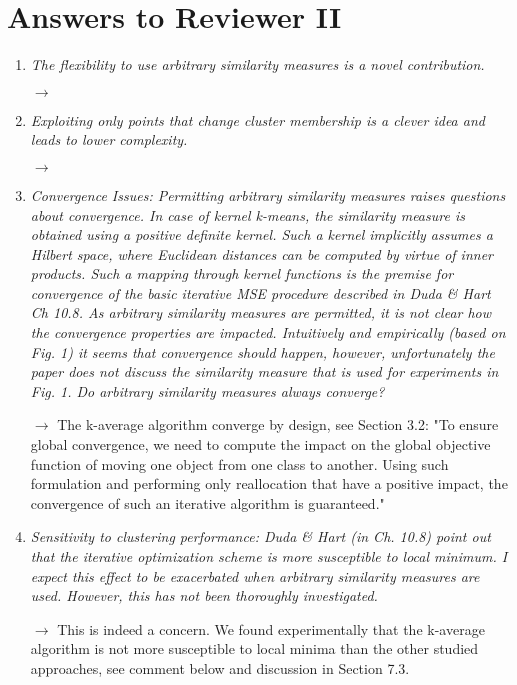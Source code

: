 \documentclass[10pt]{article}
\begin{document}
\section{Answers to Reviewer II}


\begin{enumerate}

\item \emph{The flexibility to use arbitrary similarity measures is a novel contribution.}

$\rightarrow$

\item \emph{Exploiting only points that change cluster membership is a clever idea and leads to lower complexity.}

$\rightarrow$


\item \emph{Convergence Issues: Permitting arbitrary similarity measures raises questions about convergence. In case of kernel k-means, the similarity measure is obtained using a positive definite kernel. Such a kernel implicitly assumes a Hilbert space, where Euclidean distances can be computed by virtue of inner products. Such a mapping through kernel functions is the premise for convergence of the basic iterative MSE procedure described in Duda \& Hart Ch 10.8. As arbitrary similarity measures are permitted, it is not clear how the convergence properties are impacted. Intuitively and empirically (based on Fig. 1) it seems that convergence should happen, however, unfortunately the paper does not discuss the similarity measure that is used for experiments in Fig. 1. Do arbitrary similarity measures always converge?}

$\rightarrow$ The k-average algorithm converge by design, see Section 3.2: "To ensure global convergence, we need to compute the impact on the global objective function of moving one object from one class to another. Using such formulation and performing only reallocation that have a positive impact, the convergence of such an iterative algorithm is guaranteed."

\item \emph{Sensitivity to clustering performance:
Duda \& Hart (in Ch. 10.8) point out that the iterative optimization scheme is more susceptible to local minimum. I expect this effect to be exacerbated when arbitrary similarity measures are used. However, this has not been thoroughly investigated.}

$\rightarrow$ This is indeed a concern. We found experimentally that the k-average algorithm is not more susceptible to local minima than the other studied approaches, see comment below and discussion in Section 7.3. 


\end{enumerate}
\end{document}
